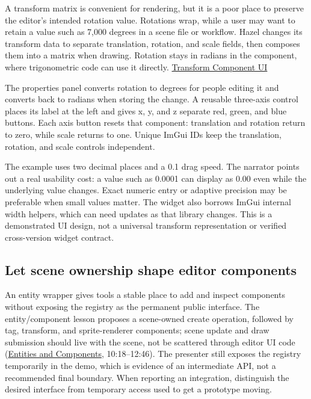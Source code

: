 A transform matrix is convenient for rendering, but it is a poor place to preserve the editor's intended rotation value. Rotations wrap, while a user may want to retain a value such as 7,000 degrees in a scene file or workflow. Hazel changes its transform data to separate translation, rotation, and scale fields, then composes them into a matrix when drawing. Rotation stays in radians in the component, where trigonometric code can use it directly. \href{https://www.youtube.com/watch?v=8JqcXYbzPJc}{Transform Component UI}

The properties panel converts rotation to degrees for people editing it and converts back to radians when storing the change. A reusable three-axis control places its label at the left and gives x, y, and z separate red, green, and blue buttons. Each axis button resets that component: translation and rotation return to zero, while scale returns to one. Unique ImGui IDs keep the translation, rotation, and scale controls independent.

The example uses two decimal places and a 0.1 drag speed. The narrator points out a real usability cost: a value such as 0.0001 can display as 0.00 even while the underlying value changes. Exact numeric entry or adaptive precision may be preferable when small values matter. The widget also borrows ImGui internal width helpers, which can need updates as that library changes. This is a demonstrated UI design, not a universal transform representation or verified cross-version widget contract.

\subsection{Let scene ownership shape editor components}\label{06-engine-ii-ch032-let-scene-ownership-shape-editor-components}

An entity wrapper gives tools a stable place to add and inspect components without exposing the registry as the permanent public interface. The entity/component lesson proposes a scene-owned create operation, followed by tag, transform, and sprite-renderer components; scene update and draw submission should live with the scene, not be scattered through editor UI code (\href{https://www.youtube.com/watch?v=-B1iu4QJTUc}{Entities and Components}, 10:18--12:46). The presenter still exposes the registry temporarily in the demo, which is evidence of an intermediate API, not a recommended final boundary. When reporting an integration, distinguish the desired interface from temporary access used to get a prototype moving.

